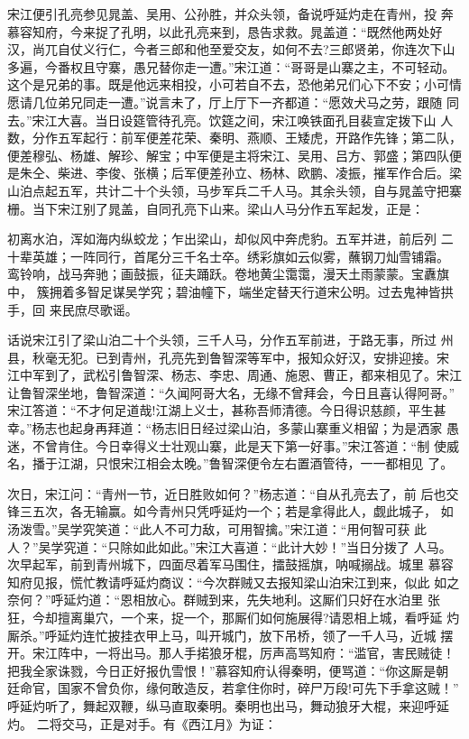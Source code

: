 宋江便引孔亮参见晁盖、吴用、公孙胜，并众头领，备说呼延灼走在青州，投
奔慕容知府，今来捉了孔明，以此孔亮来到，恳告求救。晁盖道：“既然他两处好
汉，尚兀自仗义行仁，今者三郎和他至爱交友，如何不去?三郎贤弟，你连次下山
多遍，今番权且守寨，愚兄替你走一遭。”宋江道：“哥哥是山寨之主，不可轻动。
这个是兄弟的事。既是他远来相投，小可若自不去，恐他弟兄们心下不安；小可情
愿请几位弟兄同走一遭。”说言未了，厅上厅下一齐都道：“愿效犬马之劳，跟随
同去。”宋江大喜。当日设筵管待孔亮。饮筵之间，宋江唤铁面孔目裴宣定拨下山
人数，分作五军起行：前军便差花荣、秦明、燕顺、王矮虎，开路作先锋；第二队，
便差穆弘、杨雄、解珍、解宝；中军便是主将宋江、吴用、吕方、郭盛；第四队便
是朱仝、柴进、李俊、张横；后军便差孙立、杨林、欧鹏、凌振，摧军作合后。梁
山泊点起五军，共计二十个头领，马步军兵二千人马。其余头领，自与晁盖守把寨
栅。当下宋江别了晁盖，自同孔亮下山来。梁山人马分作五军起发，正是：

初离水泊，浑如海内纵蛟龙；乍出梁山，却似风中奔虎豹。五军并进，前后列
二十辈英雄；一阵同行，首尾分三千名士卒。绣彩旗如云似雾，蘸钢刀灿雪铺霜。
鸾铃响，战马奔驰；画鼓振，征夫踊跃。卷地黄尘霭霭，漫天土雨蒙蒙。宝纛旗中，
簇拥着多智足谋吴学究；碧油幢下，端坐定替天行道宋公明。过去鬼神皆拱手，回
来民庶尽歌谣。

话说宋江引了梁山泊二十个头领，三千人马，分作五军前进，于路无事，所过
州县，秋毫无犯。已到青州，孔亮先到鲁智深等军中，报知众好汉，安排迎接。宋
江中军到了，武松引鲁智深、杨志、李忠、周通、施恩、曹正，都来相见了。宋江
让鲁智深坐地，鲁智深道：“久闻阿哥大名，无缘不曾拜会，今日且喜认得阿哥。”
宋江答道：“不才何足道哉!江湖上义士，甚称吾师清德。今日得识慈颜，平生甚
幸。”杨志也起身再拜道：“杨志旧日经过梁山泊，多蒙山寨重义相留；为是洒家
愚迷，不曾肯住。今日幸得义士壮观山寨，此是天下第一好事。”宋江答道：“制
使威名，播于江湖，只恨宋江相会太晚。”鲁智深便令左右置酒管待，一一都相见
了。

次日，宋江问：“青州一节，近日胜败如何？”杨志道：“自从孔亮去了，前
后也交锋三五次，各无输赢。如今青州只凭呼延灼一个；若是拿得此人，觑此城子，
如汤泼雪。”吴学究笑道：“此人不可力敌，可用智擒。”宋江道：“用何智可获
此人？”吴学究道：“只除如此如此。”宋江大喜道：“此计大妙！”当日分拨了
人马。次早起军，前到青州城下，四面尽着军马围住，擂鼓摇旗，呐喊搦战。城里
慕容知府见报，慌忙教请呼延灼商议：“今次群贼又去报知梁山泊宋江到来，似此
如之奈何？”呼延灼道：“恩相放心。群贼到来，先失地利。这厮们只好在水泊里
张狂，今却擅离巢穴，一个来，捉一个，那厮们如何施展得?请恩相上城，看呼延
灼厮杀。”呼延灼连忙披挂衣甲上马，叫开城门，放下吊桥，领了一千人马，近城
摆开。宋江阵中，一将出马。那人手掿狼牙棍，厉声高骂知府：“滥官，害民贼徒！
把我全家诛戮，今日正好报仇雪恨！”慕容知府认得秦明，便骂道：“你这厮是朝
廷命官，国家不曾负你，缘何敢造反，若拿住你时，碎尸万段!可先下手拿这贼！”
呼延灼听了，舞起双鞭，纵马直取秦明。秦明也出马，舞动狼牙大棍，来迎呼延灼。
二将交马，正是对手。有《西江月》为证：

